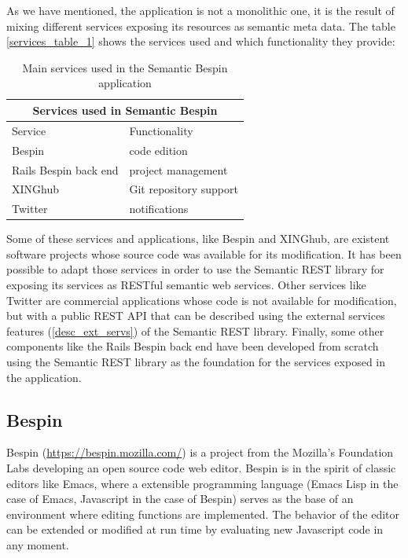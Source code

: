 As we have mentioned, the application is not a monolithic one, it is the result of mixing different services exposing
its resources as semantic meta data. The table \ref{services_table_1} shows the services used and which functionality
they provide:

\begin{table}
\begin{tabular}{|l|l|}
  \hline
  \multicolumn{2}{|c|}{Services used in Semantic Bespin} \\
  \hline
  Service & Functionality \\
  \hline
  Bespin & code edition \\
  Rails Bespin back end & project management \\
  XINGhub & Git repository support \\
  Twitter & notifications \\
  \hline
\end{tabular}
\caption{Main services used in the Semantic Bespin application}
\end{table}

Some of these services and applications, like Bespin and XINGhub, are existent software projects whose source code was
available for its modification. It has been possible to adapt those services in order to use the Semantic REST library
for exposing its services as RESTful semantic web services.
Other services like Twitter are commercial applications whose code is not available for modification, but with a public
REST API that can be described using the external services features (\ref{desc_ext_servs}) of the Semantic REST library.
Finally, some other components like the Rails Bespin back end have been developed from scratch using the Semantic REST
library as the foundation for the services exposed in the application.\\

\subsection{Bespin}

Bespin (\url{https://bespin.mozilla.com/}) is a project from the Mozilla's Foundation Labs developing an open source code web editor. Bespin is in the
spirit of classic editors like Emacs, where a extensible programming language (Emacs Lisp in the case of Emacs,
Javascript in the case of Bespin) serves as the base of an environment where editing functions are implemented. The
behavior of the editor can be extended or modified at run time by evaluating new Javascript code in any moment.\\

